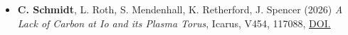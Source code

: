\documentclass[12pt]{report}
\begin{document}
\begin{itemize} \itemsep -2pt %
  \item \textbf{C. Schmidt}, L. Roth, S. Mendenhall, K. Retherford, J. Spencer (2026) \textit{A Lack of Carbon at Io and its Plasma Torus}, Icarus, V454, 117088, \href{https://doi.org/10.1016/j.icarus.2026.117088}{DOI.}  

\end{itemize}
\end{document}
